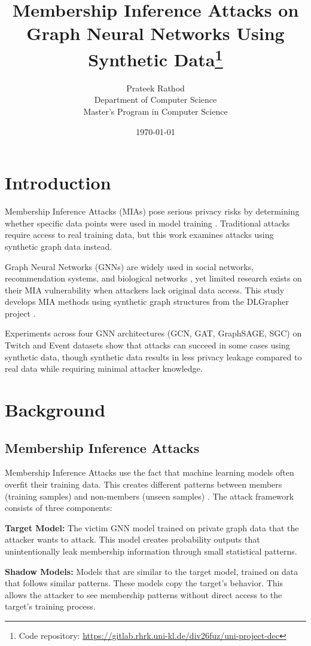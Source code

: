 \documentclass{article}
\title{Membership Inference Attacks on Graph Neural Networks Using Synthetic Data\footnote{Code repository: \url{https://gitlab.rhrk.uni-kl.de/div26fuz/uni-project-dec}}}
\author{Prateek Rathod\\
Department of Computer Science\\
Master's Program in Computer Science}
\date{\today}
\begin{document}
\maketitle

\section{Introduction}
Membership Inference Attacks (MIAs) pose serious privacy risks by determining whether specific data points were used in model training \cite{shokri2017membership}. Traditional attacks require access to real training data, but this work examines attacks using synthetic graph data instead.

Graph Neural Networks (GNNs) are widely used in social networks, recommendation systems, and biological networks \cite{kipf2017semi, velickovic2018graph, hamilton2017inductive}, yet limited research exists on their MIA vulnerability \cite{he2021membership} when attackers lack original data access. This study develops MIA methods using synthetic graph structures from the DLGrapher project \cite{dlgrapher2022}.

Experiments across four GNN architectures (GCN, GAT, GraphSAGE, SGC) on Twitch and Event datasets show that attacks can succeed in some cases using synthetic data, though synthetic data results in less privacy leakage compared to real data while requiring minimal attacker knowledge.

\section{Background}
\subsection{Membership Inference Attacks}
Membership Inference Attacks use the fact that machine learning models often overfit their training data. This creates different patterns between members (training samples) and non-members (unseen samples) \cite{salem2019ml, nasr2019comprehensive}. The attack framework consists of three components:

\textbf{Target Model:} The victim GNN model trained on private graph data that the attacker wants to attack. This model creates probability outputs that unintentionally leak membership information through small statistical patterns.

\textbf{Shadow Models:} Models that are similar to the target model, trained on data that follows similar patterns. These models copy the target's behavior. This allows the attacker to see membership patterns without direct access to the target's training process.
\end{document}
